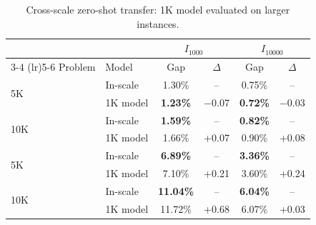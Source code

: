 \begin{table}[h]
\centering
\caption{Cross-scale zero-shot transfer: 1K model evaluated on larger instances.}
\label{tab:cross-scale}
\small
\renewcommand{\arraystretch}{0.80}
\begin{tabular*}{\columnwidth}{@{\extracolsep{\fill}}llcccc@{}}
\toprule
& & \multicolumn{2}{c}{$I_{1000}$} & \multicolumn{2}{c}{$I_{10000}$} \\
\cmidrule(lr){3-4} \cmidrule(lr){5-6}
Problem & Model & Gap & $\Delta$ & Gap & $\Delta$ \\
\midrule
\multirow{2}{*}{\TSP{}5K}
  & In-scale  & 1.30\% & --       & 0.75\% & --       \\
  & 1K model  & \textbf{1.23\%} & $-$0.07  & \textbf{0.72\%} & $-$0.03  \\
\midrule
\multirow{2}{*}{\TSP{}10K}
  & In-scale  & \textbf{1.59\%} & --       & \textbf{0.82\%} & --       \\
  & 1K model  & 1.66\% & +0.07    & 0.90\% & +0.08    \\
\midrule
\multirow{2}{*}{\CVRP{}5K}
  & In-scale  & \textbf{6.89\%} & --       & \textbf{3.36\%} & --       \\
  & 1K model  & 7.10\% & +0.21    & 3.60\% & +0.24    \\
\midrule
\multirow{2}{*}{\CVRP{}10K}
  & In-scale  & \textbf{11.04\%} & --      & \textbf{6.04\%} & --       \\
  & 1K model  & 11.72\% & +0.68   & 6.07\% & +0.03    \\
\bottomrule
\end{tabular*}
\end{table}


